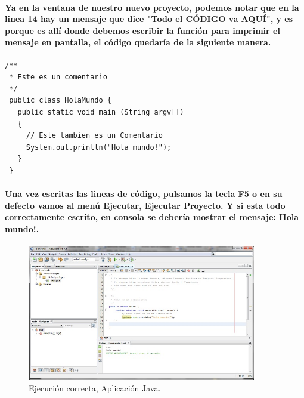\documentclass[12pt]{book} %
\begin{document}
\paragraph{Ya en la ventana de nuestro nuevo proyecto, podemos notar que en la linea 14 hay un mensaje que dice "Todo el CÓDIGO va AQUÍ", y es porque es allí donde debemos escribir la función para imprimir el mensaje en pantalla, el código quedaría de la siguiente manera.}

\noindent
\noindent
%
\begin{lstlisting}[frame=single]
/**
 * Este es un comentario
 */
 public class HolaMundo {
   public static void main (String argv[])
   {
     // Este tambien es un Comentario
     System.out.println("Hola mundo!");
   }
 }
\end{lstlisting}

\paragraph{Una vez escritas las lineas de código, pulsamos la tecla F5 o en su defecto vamos al menú Ejecutar, Ejecutar Proyecto. Y si esta todo correctamente escrito, en consola se debería mostrar el mensaje: Hola mundo!.}

	\begin{figure}[h!]
		\centering
			\includegraphics[width=10cm]{Hola_mundo_004.jpg}
			\caption{Ejecuci\'on correcta, Aplicaci\'on Java.}
		
	\end{figure}
\end{document}
